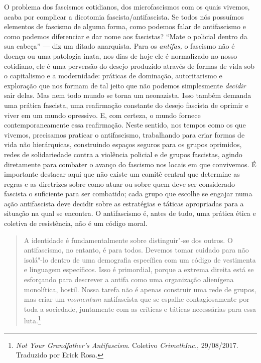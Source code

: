 O problema dos fascismos cotidianos, dos microfascismos com os quais
vivemos, acaba por complicar a dicotomia fascista/antifascista. Se todos
nós possuímos elementos de fascismo de alguma forma, como podemos falar
de antifascismo e como podemos diferenciar e dar nome aos fascistas?
``Mate o policial dentro da sua cabeça'' --- diz um ditado anarquista. Para
os \emph{antifas,} o fascismo não é doença ou uma patologia inata, nos
dias de hoje ele é normalizado no nosso cotidiano, ele é uma perversão
do desejo produzido através de formas de vida sob o capitalismo e a
modernidade: práticas de dominação, autoritarismo e exploração que nos
formam de tal jeito que não podemos simplesmente \emph{decidir} sair
delas. Mas nem todo mundo se torna um neonazista. Isso também demanda
uma prática fascista, uma reafirmação constante do desejo fascista de
oprimir e viver em um mundo opressivo. E, com certeza, o mundo fornece
contemporaneamente essa reafirmação. Neste sentido, nos tempos como os
que vivemos, precisamos praticar o antifascismo, trabalhando para criar
formas de vida não hierárquicas, construindo espaços seguros para os
grupos oprimidos, redes de solidariedade contra a violência policial e
de grupos fascistas, agindo diretamente para combater o avanço do
fascismo nos locais em que convivemos. É importante destacar aqui que não
existe um comitê central que determine as regras e as diretrizes sobre
como atuar ou sobre quem deve ser considerado fascista o suficiente para
ser combatido; cada grupo que escolhe se engajar numa ação antifascista
deve decidir sobre as estratégias e táticas apropriadas para a situação
na qual se encontra. O antifascismo é, antes de tudo, uma prática ética
e coletiva de resistência, não é um código moral.

\begin{quote}
A identidade é fundamentalmente sobre distinguir"-se dos outros. O
antifascismo, no entanto, é para todos. Devemos tomar cuidado para não
isolá"-lo dentro de uma demografia específica com um código de vestimenta
e linguagem específicos. Isso é primordial, porque a extrema direita
está se esforçando para descrever a antifa como uma organização
alienígena monolítica, hostil. Nossa tarefa não é apenas construir uma
rede de grupos, mas criar um \emph{momentum} antifascista que se espalhe
contagiosamente por toda a sociedade, juntamente com as críticas e
táticas necessárias para essa luta.\footnote{\emph{Not
  Your Grandfather's Antifascism}. Coletivo \emph{CrimethInc.}, 29/08/2017. Traduzido por Erick Rosa.}
\end{quote}

